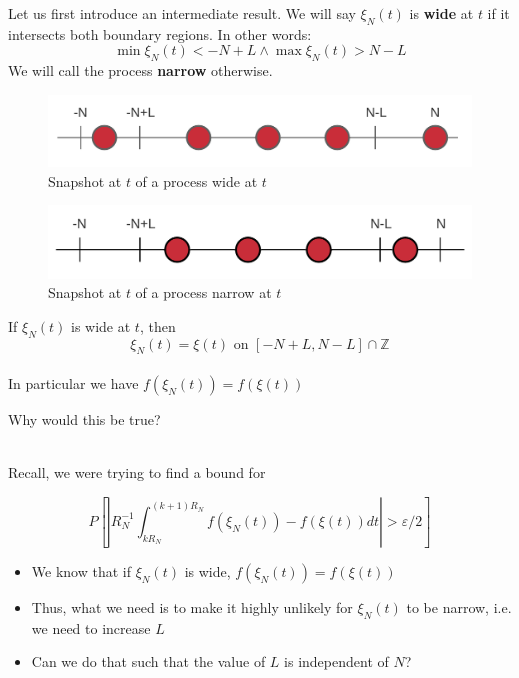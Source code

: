 \documentclass{beamer}
\begin{document}
\begin{frame}
    Let us first introduce an intermediate result. We will say $\xi_N(t)$ is \textbf{wide} at $t$ if 
    it intersects both boundary regions. In other words:
    \[
        \min\xi_N(t) < -N + L \land \max\xi_N(t) > N - L
    \]
    We will call the process \textbf{narrow} otherwise.
    \begin{figure}[H]
        \centering
        \includegraphics[scale=0.15]{./img/wide_process.png}
        \caption{Snapshot at $t$ of a process wide at $t$}
        \label{fig:wide_process}
    \end{figure}
    \begin{figure}[H]
        \centering
        \includegraphics[scale=0.15]{./img/narrow_proces.png}
        \caption{Snapshot at $t$ of a process narrow at $t$}
        \label{fig:narrow_process}
    \end{figure}

\end{frame}
\begin{frame}
    \begin{lemma}
        If $\xi_N(t)$ is wide at $t$, then \[\xi_N(t) = \xi(t)\text{ on }[-N + L, N - L] \cap \mathbb{Z}\]\\
        In particular we have $f(\xi_N(t)) = f(\xi(t))$
    \end{lemma}
    Why would this be true? \\~\\

\end{frame}

\begin{frame}
    Recall, we were trying to find a bound for

    \[
        P\left[ \left|R_N^{-1}\int_{kR_N}^{(k+1)R_N}f(\xi_N(t)) - f(\xi(t))dt \right| > \varepsilon/2  \right]
    \]

    \begin{itemize}
        \item <2-> We know that if $\xi_N(t)$ is wide, $f(\xi_N(t)) = f(\xi(t))$
        \item <3-> Thus, what we need is to make it highly unlikely for $\xi_N(t)$ to be narrow, i.e. we need to increase $L$
        \item <4-> Can we do that such that the value of $L$ is independent of $N$?
    \end{itemize}
\end{frame}
\end{document}
